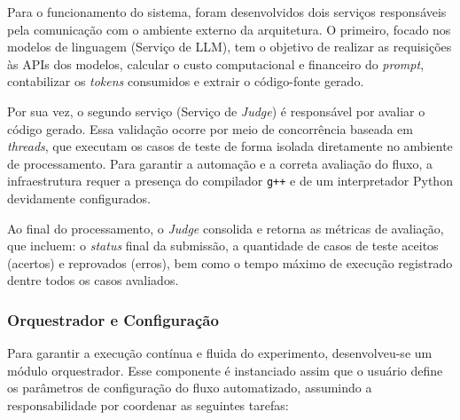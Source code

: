 \documentclass[sigconf,anonymous]{acmart} %
\begin{document}
Para o funcionamento do sistema, foram desenvolvidos dois serviços responsáveis pela comunicação com o ambiente externo da arquitetura. O primeiro, focado nos modelos de linguagem (Serviço de LLM), tem o objetivo de realizar as requisições às APIs dos modelos, calcular o custo computacional e financeiro do \textit{prompt}, contabilizar os \textit{tokens} consumidos e extrair o código-fonte gerado. 

Por sua vez, o segundo serviço (Serviço de \textit{Judge}) é responsável por avaliar o código gerado. Essa validação ocorre por meio de concorrência baseada em \textit{threads}, que executam os casos de teste de forma isolada diretamente no ambiente de processamento. Para garantir a automação e a correta avaliação do fluxo, a infraestrutura requer a presença do compilador \texttt{g++} e de um interpretador Python devidamente configurados.

Ao final do processamento, o \textit{Judge} consolida e retorna as métricas de avaliação, que incluem: o \textit{status} final da submissão, a quantidade de casos de teste aceitos (acertos) e reprovados (erros), bem como o tempo máximo de execução registrado dentre todos os casos avaliados.

\subsubsection{Orquestrador e Configuração}
\label{sec:Orquestrador e configuracao}

Para garantir a execução contínua e fluida do experimento, desenvolveu-se um módulo orquestrador. Esse componente é instanciado assim que o usuário define os parâmetros de configuração do fluxo automatizado, assumindo a responsabilidade por coordenar as seguintes tarefas:
\end{document}
